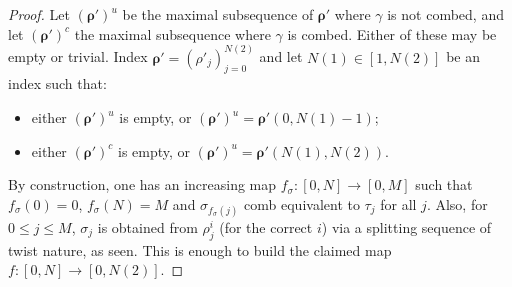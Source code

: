 \begin{proof}
Let $(\bm\rho')^u$ be the maximal subsequence of $\bm\rho'$ where $\gamma$ is not combed, and let $(\bm\rho')^c$ the maximal subsequence where $\gamma$ is combed. Either of these may be empty or trivial. Index $\bm\rho'=(\rho'_j)_{j=0}^{N(2)}$ and let $N(1)\in [1,N(2)]$ be an index such that:
\begin{itemize}
\item either $(\bm\rho')^u$ is empty, or $(\bm\rho')^u=\bm\rho'(0,N(1)-1)$;
\item either $(\bm\rho')^c$ is empty, or $(\bm\rho')^u=\bm\rho'(N(1), N(2))$.
\end{itemize}

By construction, one has an increasing map $f_\sigma:[0,N]\rightarrow[0,M]$ such that $f_\sigma(0)=0$, $f_\sigma(N)=M$ and $\sigma_{f_{\sigma}(j)}$ comb equivalent to $\tau_j$ for all $j$. Also, for $0\leq j\leq M$, $\sigma_j$ is obtained from $\rho^i_j$ (for the correct $i$) via a splitting sequence of twist nature, as seen. This is enough to build the claimed map $f:[0,N]\rightarrow [0,N(2)]$.


%



\end{proof}
